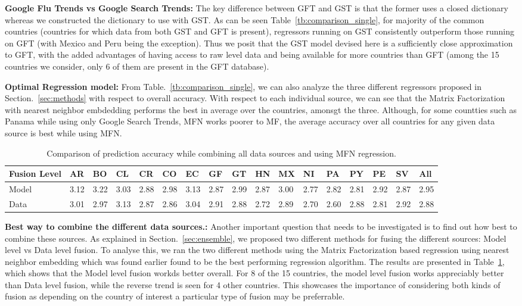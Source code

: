 {\noindent \textbf{Google Flu Trends vs Google Search Trends:}}  
The key difference between GFT and GST is that the former uses a closed dictionary whereas
we constructed the dictionary to use with GST.
As can be seen Table~\ref{tb:comparison_single},
for majority of the common countries (countries for which data from both GST and GFT
is present), regressors running on GST consistently 
outperform those running on GFT (with Mexico and Peru being the exception).
Thus we posit that the GST model devised here is a sufficiently close approximation to GFT, 
with the added advantages of having access to raw level data and being available for more countries 
than GFT (among the 15 countries we consider, only 6 of them are present in the GFT database).

{\noindent \textbf{Optimal Regression model: }} From Table.~\ref{tb:comparison_single}, we can also
analyze the three different regressors proposed in Section.~\ref{sec:methods} with respect to overall accuracy.
With respect to each individual source, we can see that the Matrix Factorization with nearest 
neighbor embdedding performs the best in average over the countries, amonsgt the three.
Although, for some countties such as Panama while using only Google Search Trends, MFN works poorer to 
MF, the average accuracy over all countries for any given data source is best while using MFN.

\begin{table}[tb!]
  \centering
  \caption{\label{tb:comparison_ensemble}Comparison of prediction accuracy while combining all data sources
  and using MFN regression.}
\vspace{1em}
  \begin{tabular}{|p{1.5cm}|*{16}{l|}}
\hline
Fusion Level& AR & BO & CL & CR & CO & EC & GF & GT & HN & MX & NI & PA & PY & PE & SV & All\\
\hline \hline
Model       &3.12&3.22&3.03&2.88&2.98&3.13&2.87&2.99&2.87&3.00&2.77&2.82&2.81&2.92&2.87&2.95\\ 
Data        &3.01&2.97&3.13&2.87&2.86&3.04&2.91&2.88&2.72&2.89&2.70&2.60&2.88&2.81&2.92&2.88\\ 
\hline
\end{tabular}
\end{table}

{\noindent \textbf{Best way to combine the different data sources.: }} Another important 
question that needs to be investigated is to find out how best to combine these sources. 
As explained in Section.~\ref{sec:ensemble}, we proposed two different methods for fusing the
different sources: Model level vs Data level fusion. To analyse this, we ran the two different methods
using the Matrix Factorization based regression using nearest neighbor embedding which was found earlier 
found to be the best performing regression algorithm. The results are presented in Table~\ref{tb:comparison_ensemble}, 
which shows that the Model level fusion workds better overall. For 8 of the 15 countries, the model level fusion works
appreciably better than Data level fusion, while the reverse trend is seen for 4 other countries. 
This showcases the importance of considering both kinds of fusion as depending on the country of interest 
a particular type of fusion may be preferrable.

